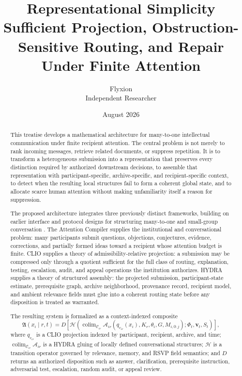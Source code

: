 \documentclass[11pt]{article}
\title{
  \textbf{Representational Simplicity}\\[0.4em]
  \large Sufficient Projection, Obstruction-Sensitive Routing,
  and Repair Under Finite Attention
}
\author{
  Flyxion\\
  \small Independent Researcher
}
\date{August 2026}
\theoremstyle{definition}
\DeclareMathOperator{\colim}{colim}
\newcommand{\C}{\mathcal{C}}
\newcommand{\A}{\mathcal{A}}
\newcommand{\Hh}{\mathcal{H}}
\newcommand{\FieldPhi}{\Phi}
\newcommand{\FieldV}{\mathbf{v}}
\newcommand{\FieldS}{S}
\newcommand{\AC}{\mathfrak{A}}
\begin{document}
\maketitle

\begin{abstract}
This treatise develops a mathematical architecture for many-to-one intellectual communication under finite recipient attention. The central problem is not merely to rank incoming messages, retrieve related documents, or suppress repetition. It is to transform a heterogeneous submission into a representation that preserves every distinction required by authorized downstream decisions, to assemble that representation with participant-specific, archive-specific, and recipient-specific context, to detect when the resulting local structures fail to form a coherent global state, and to allocate scarce human attention without making unfamiliarity itself a reason for suppression.

The proposed architecture integrates three previously distinct frameworks, building on earlier interface and protocol designs for structuring many-to-one and small-group conversation \cite{anderson2009dialog,anderson2011thinwalls,anderson2022bubblecity,brown2005worldcafe}. The Attention Compiler supplies the institutional and conversational problem: many participants submit questions, objections, conjectures, evidence, corrections, and partially formed ideas toward a recipient whose attention budget is finite. CLIO supplies a theory of admissibility-relative projection: a submission may be compressed only through a quotient sufficient for the full class of routing, explanation, testing, escalation, audit, and appeal operations the institution authorizes. HYDRA supplies a theory of structured assembly: the projected submission, participant-state estimate, prerequisite graph, archive neighborhood, provenance record, recipient model, and ambient relevance fields must glue into a coherent routing state before any disposition is treated as warranted.

The resulting system is formalized as a context-indexed composite
\[
\AC(x_i\mid r,t)
=
D\!\left[
\Hh
\left(
\colim_{\C_{ir}}
\A_{ir}
\left(
q_{c_{ir}}(x_i),
K_r,
\theta_i,
G,
M_{i,0:j}
\right);
\FieldPhi_t,\FieldV_t,\FieldS_t
\right)
\right],
\]
where \(q_{c_{ir}}\) is a CLIO projection indexed by participant, recipient, archive, and time; \(\colim_{\C_{ir}}\A_{ir}\) is a HYDRA gluing of locally defined conversational structures; \(\Hh\) is a transition operator governed by relevance, memory, and RSVP field semantics; and \(D\) returns an authorized disposition such as answer, clarification, prerequisite instruction, adversarial test, escalation, random audit, or appeal review.


\end{abstract}
\end{document}
